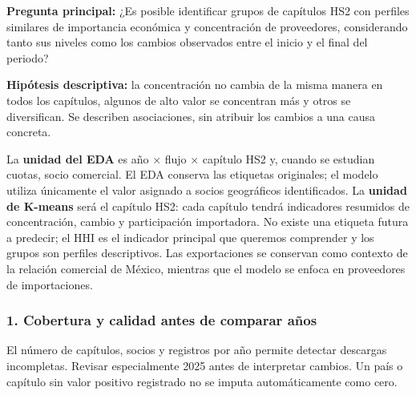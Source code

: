\documentclass[
]{article}
\newenvironment{Shaded}{\begin{snugshade}}{\end{snugshade}}
\newcommand{\AttributeTok}[1]{\textcolor[rgb]{0.13,0.29,0.53}{#1}}
\newcommand{\DecValTok}[1]{\textcolor[rgb]{0.00,0.00,0.81}{#1}}
\newcommand{\FunctionTok}[1]{\textcolor[rgb]{0.13,0.29,0.53}{\textbf{#1}}}
\newcommand{\NormalTok}[1]{#1}
\newcommand{\OtherTok}[1]{\textcolor[rgb]{0.56,0.35,0.01}{#1}}
\newcommand{\SpecialCharTok}[1]{\textcolor[rgb]{0.81,0.36,0.00}{\textbf{#1}}}
\newcommand{\StringTok}[1]{\textcolor[rgb]{0.31,0.60,0.02}{#1}}
\begin{document}
\textbf{Pregunta principal:} ¿Es posible identificar grupos de capítulos
HS2 con perfiles similares de importancia económica y concentración de
proveedores, considerando tanto sus niveles como los cambios observados
entre el inicio y el final del periodo?

\textbf{Hipótesis descriptiva:} la concentración no cambia de la misma
manera en todos los capítulos, algunos de alto valor se concentran más y
otros se diversifican. Se describen asociaciones, sin atribuir los
cambios a una causa concreta.

La \textbf{unidad del EDA} es año × flujo × capítulo HS2 y, cuando se
estudian cuotas, socio comercial. El EDA conserva las etiquetas
originales; el modelo utiliza únicamente el valor asignado a socios
geográficos identificados. La \textbf{unidad de K-means} será el
capítulo HS2: cada capítulo tendrá indicadores resumidos de
concentración, cambio y participación importadora. No existe una
etiqueta futura a predecir; el HHI es el indicador principal que
queremos comprender y los grupos son perfiles descriptivos. Las
exportaciones se conservan como contexto de la relación comercial de
México, mientras que el modelo se enfoca en proveedores de
importaciones.

\subsubsection{1. Cobertura y calidad antes de comparar
años}\label{cobertura-y-calidad-antes-de-comparar-auxf1os}

El número de capítulos, socios y registros por año permite detectar
descargas incompletas. Revisar especialmente 2025 antes de interpretar
cambios. Un país o capítulo sin valor positivo registrado no se imputa
automáticamente como cero.

\begin{Shaded}
\end{Shaded}
\end{document}
